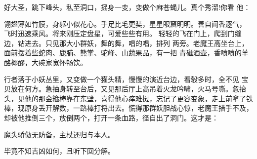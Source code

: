 好大圣，跳下峰头，私至洞口，摇身一变，变做个麻苍蝇儿。真个秀溜!你看
他：

翎翅薄如竹膜，身躯小似花心。手足比毛更奘，星星眼窟明明。善自闻香逐气，
飞时迅速乘风。将来刚压定盘星，可爱些些有用。
轻轻的飞在门上，爬到门缝边，钻进去。只见那大小群妖，舞的舞，唱的唱，排列
两旁。老魔王高坐台上，面前摆着些蛇肉、鹿脯、熊掌、驼峰、山蔬果品，有一把
青磁酒壶，香喷喷的羊酪椰醪，大碗家宽怀畅饮。

行者落于小妖丛里，又变做一个獾头精，慢慢的演近台边，看彀多时，全不见
宝贝放在何方。急抽身转至台后，又见那后厅上高吊着火龙吟啸，火马号嘶。忽抬
头，见他的那金箍棒靠在东壁，喜得他心痒难挝，忘记了更容变象，走上前拿了铁
棒，现原身丢开解数，一路棒打将出去。慌得那群妖胆战心惊，老魔王措手不及，
却被他推倒三个，放倒两个，打开一条血路，径自出了洞门。这才是：

魔头骄傲无防备，主杖还归与本人。

毕竟不知吉凶如何，且听下回分解。